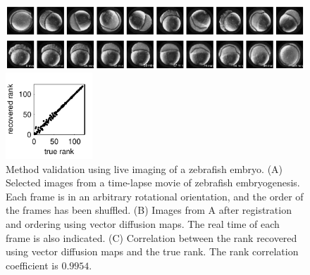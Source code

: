\documentclass[twocolumn, 10pt]{article}
\begin{document}
\begin{figure}[t]
\begin{minipage}[c]{13.75cm}
\vspace{0cm}
\includegraphics[width=13cm]{zebrafish_scrambled}

\includegraphics[width=13cm]{zebrafish_ordered}
\end{minipage}
%
\hfill
%
\begin{minipage}[c]{3.75cm}

\vspace{0cm}
%
\includegraphics[width=3.25cm]{zebrafish_rank_corr}
\end{minipage}
\caption{Method validation using live imaging of a zebrafish embryo. (A) Selected images from a time-lapse movie of zebrafish embryogenesis. Each frame is in an arbitrary rotational orientation, and the order of the frames has been shuffled. (B) Images from A after registration and ordering using vector diffusion maps. The real time of each frame is also indicated. (C) Correlation between the rank recovered using vector diffusion maps and the true rank.  The rank correlation coefficient is $0.9954$.}
\label{fig:zebrafish}
\end{figure}
\end{document}
